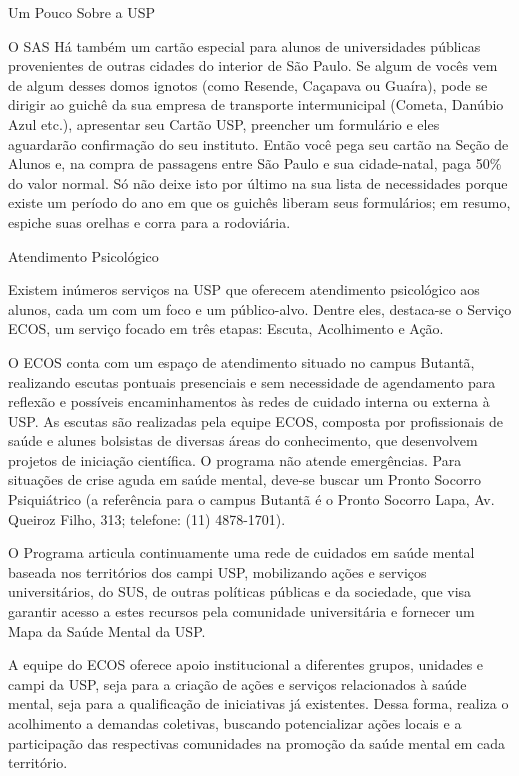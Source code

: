 \begin{secao}{Um Pouco Sobre a USP}
\begin{subsecao}{O SAS}
Há também um cartão especial para alunos de universidades públicas provenientes
de outras cidades do interior de São Paulo. Se algum de vocês vem de algum desses domos
ignotos (como Resende, Caçapava ou Guaíra), pode se dirigir ao guichê da sua empresa de
transporte intermunicipal (Cometa, Danúbio Azul etc.), apresentar seu Cartão USP,
preencher um formulário e eles aguardarão confirmação do seu instituto. Então
você pega seu cartão na Seção de Alunos e, na compra de passagens entre São Paulo
e sua cidade-natal, paga 50\% do valor normal. Só não deixe isto por último na
sua lista de necessidades porque existe um período do ano em que os guichês
liberam seus formulários; em resumo, espiche suas orelhas e corra para a rodoviária.

\end{subsecao}

\begin{subsecao}{Atendimento Psicológico}

Existem inúmeros serviços na USP que oferecem atendimento psicológico
aos alunos, cada um com um foco e um público-alvo. Dentre eles, destaca-se
o Serviço ECOS, um serviço focado em três etapas: Escuta, Acolhimento e Ação.

O ECOS conta com um espaço de atendimento situado no campus Butantã, realizando 
escutas pontuais presenciais e sem necessidade de agendamento para reflexão e possíveis 
encaminhamentos às redes de cuidado interna ou externa à USP. As escutas são realizadas 
pela equipe ECOS, composta por profissionais de saúde e alunes bolsistas de diversas áreas 
do conhecimento, que desenvolvem projetos de iniciação científica. O programa não atende
emergências. Para situações de crise aguda em saúde mental, deve-se buscar um Pronto Socorro 
Psiquiátrico (a referência para o campus Butantã é o Pronto Socorro Lapa, Av. Queiroz Filho, 
313; telefone: (11) 4878-1701).

O Programa articula continuamente uma rede de cuidados em saúde mental baseada nos
territórios dos campi USP, mobilizando ações e serviços universitários, do SUS, de 
outras políticas públicas e da sociedade, que visa garantir acesso a estes recursos 
pela comunidade universitária e fornecer um Mapa da Saúde Mental da USP.

A equipe do ECOS oferece apoio institucional a diferentes grupos, unidades e campi da 
USP, seja para a criação de ações e serviços relacionados à saúde mental, seja para a 
qualificação de iniciativas já existentes. Dessa forma, realiza o acolhimento a demandas 
coletivas, buscando potencializar ações locais e a participação das respectivas comunidades 
na promoção da saúde mental em cada território.


\end{subsecao}
\end{secao}

